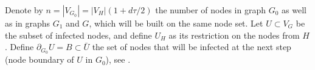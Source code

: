 \documentclass[a4paper,USenglish,cleveref, autoref, thm-restate]{lipics-v2021}
\begin{document}
Denote by $n = |V_{G_0}| = |V_H|(1 + d\tau/2)$ the number of nodes in graph $G_0$ as well as in graphs $G_1$ and $G$, which will be built on the same node set.
Let $U \subset V_G$ be the subset of infected nodes, and define $U_H$ as its restriction on the nodes from $H$. 
Define $\partial_{G_0}U = B\subset \bar U$ the set of nodes that will be infected at the next step (node boundary of $U$ in $G_0$), see .
\begin{figure}[h!]
    \centering











\begin{tikzpicture}[x=0.75pt,y=0.75pt,yscale=-1,xscale=1]


\end{tikzpicture}
\end{figure}
\end{document}
